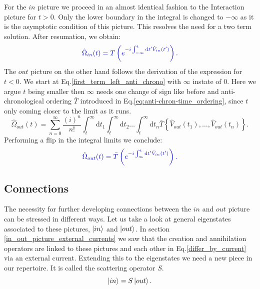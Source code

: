 \documentclass[12pt, titlepage]{article}
\begin{document}
For the $ in $ picture we proceed in an almost identical fashion to the Interaction picture for $ t > 0 $. Only the lower boundary in the integral is changed to $ -\infty $ as it is the asymptotic condition of this picture. This resolves the need for a two term solution. 
After resumation, we obtain:
\begin{equation}\label{eq:Omega_in_converg}
\textcolor[RGB]{0,0,204}{
\hat{\Omega}_{in}(t)
= T\left( e^{-i\int_{-\infty}^{t}\mathrm{d}t^{\prime} \hat{V}_{in}(t^{\prime})} \right)
	.}
\end{equation}
The $ out $ picture on the other hand follows the derivation of the expression for $ t < 0 $. We start at Eq.\enskip\eqref{first_term_left_anti_chrono} with $ \infty $ instate of $ 0 $. Here we argue $ t $ being smaller then $ \infty $ needs one change of sign like before and anti-chronological ordering $ \bar{T} $ introduced in Eq.\enskip\eqref{eq:anti-chron-time_ordering}, since $ t $ only coming closer to the limit as it runs.
\begin{equation}
\hat{\Omega}_{out}(t) =
\sum\limits_{n=0}^{\infty} 
\frac{(i)^{n}}{n!}
\int^{\infty}_{t}\mathrm{d}t_1\int^{\infty}_{t}\! \! \mathrm{d}t_2
 \ldots
 \int^{\infty}_{t}\! \! \mathrm{d}t_n
 \bar{T}\left\lbrace \hat{V}_{out}(t_1), \ldots , \hat{V}_{out}(t_n)\right\rbrace .
\end{equation}
Performing a flip in the integral limits we conclude:
\begin{equation}\label{eq:Omega_out_converg}
\textcolor[RGB]{0,0,204}{
\hat{\Omega}_{out}(t)
= \bar{T}\left( e^{-i\int_{\infty}^{t}\mathrm{d}t^{\prime} \hat{V}_{in}(t^{\prime})} \right)
	.}
\end{equation}
\subsection{Connections}\label{Connections}
The necessity for further developing connections between the $ in $ and $ out $ picture can be stressed in different ways. 
Let us take a look at general eigenstates associated to these pictures, $ \ket{in} $ and $ \ket{out} $. In section \ref{in_out_picture_external_currents} we saw that the creation and annihilation operators are linked to these pictures and each other in Eq.\enskip\eqref{differ_by_current} via an external current. 
Extending this to the eigenstates we need a new piece in our repertoire. It is called the scattering operator $ S $.
\begin{equation}
\ket{in}=S\ket{out}.
\end{equation}
\end{document}
